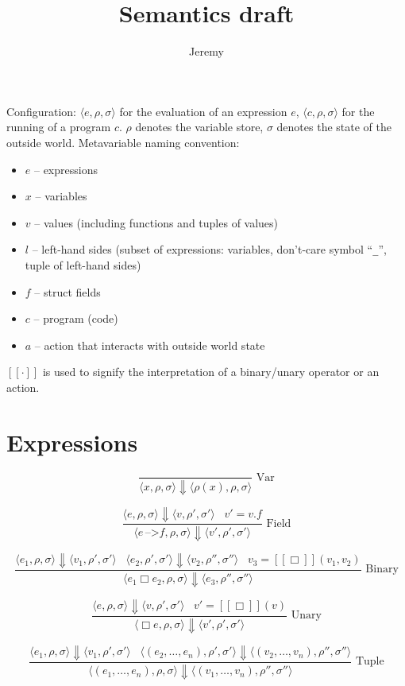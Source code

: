 \documentclass[a4paper]{article}
\title{Semantics draft}
\author{Jeremy}
\newcommand{\mem}{\rho}
\newcommand{\glob}{\sigma}
\newcommand{\bkt}[1]{\langle #1\rangle}
\newcommand{\intp}[1]{[\![#1]\!]}
\newcommand{\eval}{\Downarrow}
\newcommand{\also}{\,\,\,\,\,}
\newcommand{\semrule}[3]{\[\dfrac{#2}{#3}\,\,\text{#1}\]}
\begin{document}
\maketitle

Configuration: \(\bkt{e,\mem,\glob}\) for the evaluation of an expression \(e\), \(\bkt{c,\mem,\glob}\) for the running of a program \(c\). \(\mem\) denotes the variable store, \(\glob\) denotes the state of the outside world.
%
Metavariable naming convention:
\begin{itemize}
\item \(e\) -- expressions
\item \(x\) -- variables
\item \(v\) -- values (including functions and tuples of values)
\item \(l\) -- left-hand sides (subset of expressions: variables, don't-care symbol ``\texttt{\_}'', tuple of left-hand sides)
\item \(f\) -- struct fields
\item \(c\) -- program (code)
\item \(a\) -- action that interacts with outside world state
\end{itemize}
%
\(\intp{\cdot}\) is used to signify the interpretation of a binary/unary operator or an action.

\section*{Expressions}

\semrule{Var}{}{\bkt{x,\mem,\glob} \eval \bkt{\mem(x),\mem,\glob}}

\semrule{Field}
{\bkt{e,\mem,\glob} \eval \bkt{v,\mem',\glob'}
\also v'=v.f}
{\bkt{e\,\texttt{-->}f,\mem,\glob} \eval \bkt{v',\mem',\glob'}}

\semrule{Binary}
{\bkt{e_1,\mem,\glob} \eval \bkt{v_1,\mem',\glob'}
\also \bkt{e_2,\mem',\glob'} \eval \bkt{v_2,\mem'',\glob''}
\also v_3 = \intp{\Box}(v_1,v_2)}
{\bkt{e_1 \Box e_2,\mem,\glob} \eval \bkt{e_3,\mem'',\glob''}}

\semrule{Unary}
{\bkt{e,\mem,\glob} \eval \bkt{v,\mem',\glob'}
\also v' = \intp{\Box}(v)}
{\bkt{\Box e,\mem,\glob} \eval \bkt{v',\mem',\glob'}}

\semrule{Tuple}
{\bkt{e_1,\mem,\glob} \eval \bkt{v_1,\mem',\glob'}
\also \bkt{(e_2,\ldots,e_n),\mem',\glob'} \eval \bkt{(v_2,\ldots,v_n),\mem'',\glob''}}
{\bkt{(e_1,\ldots,e_n),\mem,\glob} \eval \bkt{(v_1,\ldots,v_n),\mem'',\glob''}}
\end{document}
